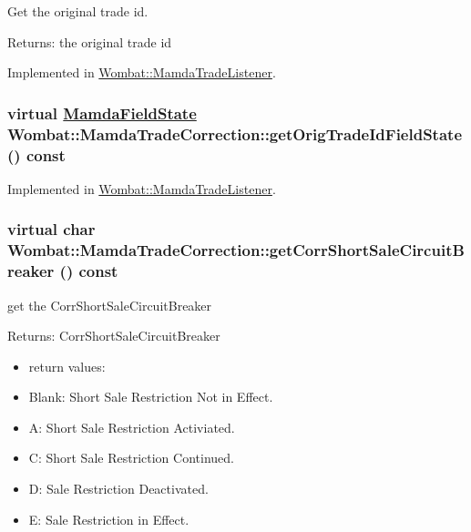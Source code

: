 Get the original trade id. 

\begin{Desc}
\item[Returns:]the original trade id \end{Desc}


Implemented in \hyperlink{classWombat_1_1MamdaTradeListener_f63f45ca9303c611b885390a012d6b87}{Wombat::Mamda\-Trade\-Listener}.\hypertarget{classWombat_1_1MamdaTradeCorrection_83e5e5027f10de660714a6bc9e283e6c}{
\subsubsection[getOrigTradeIdFieldState]{\setlength{\rightskip}{0pt plus 5cm}virtual \hyperlink{namespaceWombat_93aac974f2ab713554fd12a1fa3b7d2a}{Mamda\-Field\-State} Wombat::Mamda\-Trade\-Correction::get\-Orig\-Trade\-Id\-Field\-State () const}}
\label{classWombat_1_1MamdaTradeCorrection_83e5e5027f10de660714a6bc9e283e6c}




Implemented in \hyperlink{classWombat_1_1MamdaTradeListener_0bb23e403d65e8c21a3e9474fba0273a}{Wombat::Mamda\-Trade\-Listener}.\hypertarget{classWombat_1_1MamdaTradeCorrection_6e5f69c0e6bb8cf2a4a2d25ef83f7aac}{
\subsubsection[getCorrShortSaleCircuitBreaker]{\setlength{\rightskip}{0pt plus 5cm}virtual char Wombat::Mamda\-Trade\-Correction::get\-Corr\-Short\-Sale\-Circuit\-Breaker () const}}
\label{classWombat_1_1MamdaTradeCorrection_6e5f69c0e6bb8cf2a4a2d25ef83f7aac}


get the Corr\-Short\-Sale\-Circuit\-Breaker 

\begin{Desc}
\item[Returns:]Corr\-Short\-Sale\-Circuit\-Breaker \begin{itemize}
\item return values: \item Blank: Short Sale Restriction Not in Effect. \item A: Short Sale Restriction Activiated. \item C: Short Sale Restriction Continued. \item D: Sale Restriction Deactivated. \item E: Sale Restriction in Effect. \end{itemize}
\end{Desc}


